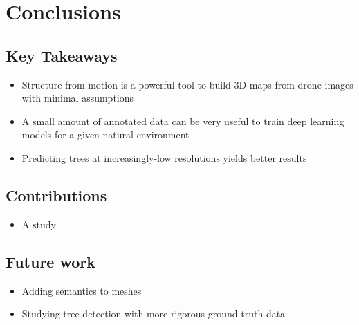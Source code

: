 
\chapter{Conclusions} \label{chapConclusions}
\section{Key Takeaways}
\begin{itemize}
    \item Structure from motion is a powerful tool to build 3D maps from drone images with minimal assumptions
    \item A small amount of annotated data can be very useful to train deep learning models for a given natural environment
    \item Predicting trees at increasingly-low resolutions yields better results 
\end{itemize}
\section{Contributions}
\begin{itemize}
    \item A study  
\end{itemize}
\section{Future work}
\begin{itemize}
    \item Adding semantics to meshes 
    \item Studying tree detection with more rigorous ground truth data
\end{itemize}


